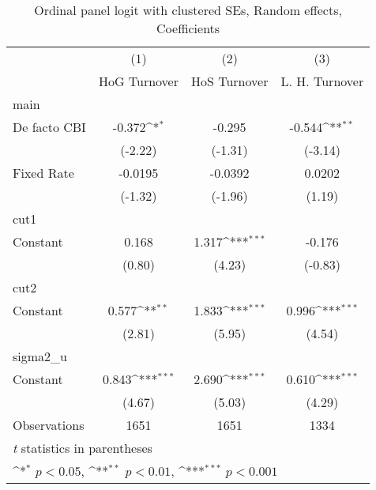 \begin{table}[htbp]\centering
\def\sym#1{\ifmmode^{#1}\else\(^{#1}\)\fi}
\caption{Ordinal panel logit with clustered SEs, Random effects, Coefficients \label{coeffordLogDF}}
\begin{tabular}{l*{3}{c}}
\toprule
                                        &\multicolumn{1}{c}{(1)}&\multicolumn{1}{c}{(2)}&\multicolumn{1}{c}{(3)}\\
                                        &\multicolumn{1}{c}{HoG Turnover}&\multicolumn{1}{c}{HoS Turnover}&\multicolumn{1}{c}{L. H. Turnover}\\
\midrule
main                                    &                  &                  &                  \\
De facto CBI                            &   -0.372\sym{*}  &   -0.295         &   -0.544\sym{**} \\
                                        &  (-2.22)         &  (-1.31)         &  (-3.14)         \\
\addlinespace
Fixed Rate                              &  -0.0195         &  -0.0392         &   0.0202         \\
                                        &  (-1.32)         &  (-1.96)         &   (1.19)         \\
\midrule
cut1                                    &                  &                  &                  \\
Constant                                &    0.168         &    1.317\sym{***}&   -0.176         \\
                                        &   (0.80)         &   (4.23)         &  (-0.83)         \\
\midrule
cut2                                    &                  &                  &                  \\
Constant                                &    0.577\sym{**} &    1.833\sym{***}&    0.996\sym{***}\\
                                        &   (2.81)         &   (5.95)         &   (4.54)         \\
\midrule
sigma2\_u                                &                  &                  &                  \\
Constant                                &    0.843\sym{***}&    2.690\sym{***}&    0.610\sym{***}\\
                                        &   (4.67)         &   (5.03)         &   (4.29)         \\
\midrule
Observations                            &     1651         &     1651         &     1334         \\
\bottomrule
\multicolumn{4}{l}{\footnotesize \textit{t} statistics in parentheses}\\
\multicolumn{4}{l}{\footnotesize \sym{*} \(p<0.05\), \sym{**} \(p<0.01\), \sym{***} \(p<0.001\)}\\
\end{tabular}
\end{table}
